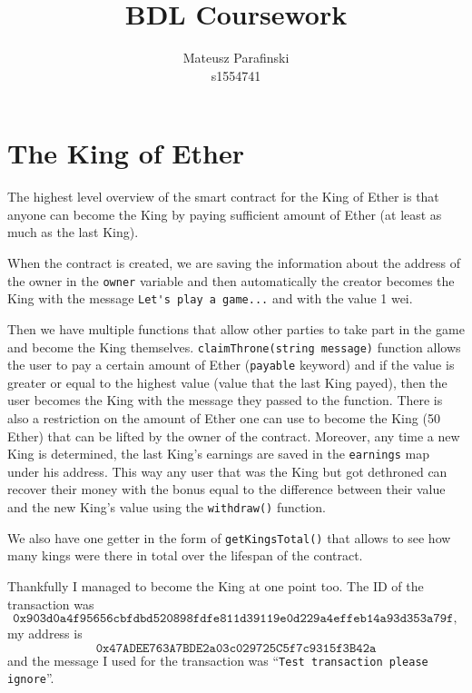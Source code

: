 \documentclass{article}
\title{BDL Coursework}
\author{Mateusz Parafinski\\\small s1554741}
\date{}
\begin{document}
    \maketitle
    \newpage
    \clearpage
    \setcounter{page}{1}

    \section{The King of Ether}
    The highest level overview of the smart contract for the
    King of Ether is that anyone can become the King by
    paying sufficient amount of Ether (at least as much as
    the last King).
    \newline

    \noindent When the contract is created, we are saving
    the information about the address of the owner in the
    \verb|owner| variable and then automatically the creator
    becomes the King with the message \verb|Let's play a game...| 
    and with the value 1 wei.
    \newline

    \noindent Then we have multiple functions that allow
    other parties to take part in the game and become the
    King themselves. \verb|claimThrone(string message)|
    function allows the user to pay a certain amount of
    Ether (\verb|payable| keyword) and if the value is
    greater or equal to the highest value (value that the
    last King payed), then the user becomes the King with
    the message they passed to the function. There is also a
    restriction on the amount of Ether one can use to become
    the King (50 Ether) that can be lifted by the owner of
    the contract. Moreover, any time a new King is
    determined, the last King's earnings are saved in the
    \verb|earnings| map under his address. This way any user
    that was the King but got dethroned can recover their
    money with the bonus equal to the difference between
    their value and the new King's value using the
    \verb|withdraw()| function.
    \newline

    \noindent We also have one getter in the form of
    \verb|getKingsTotal()| that allows to see how many kings
    were there in total over the lifespan of the contract.
    \newline

    \noindent Thankfully I managed to become the King at one
    point too. The ID of the transaction was 
    \[
        \texttt{0x903d0a4f95656cbfdbd520898fdfe811d39119e0d229a4effeb14a93d353a79f},
    \]
    my address is
    \[
        \texttt{0x47ADEE763A7BDE2a03c029725C5f7c9315f3B42a}
    \]
    and the message I used for the transaction was
    ``\verb|Test transaction please ignore|''.
\end{document}
